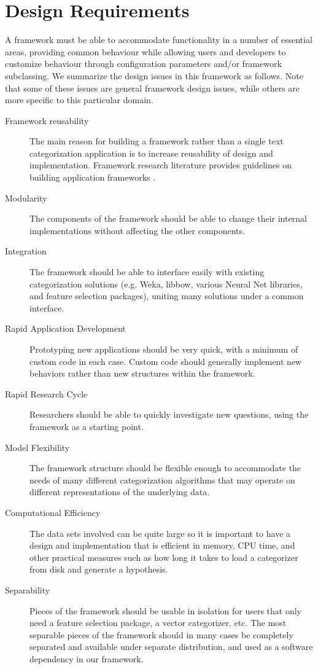 \documentclass[a4paper,twocolumn]{article}
\begin{document}
\section{Design Requirements}

A framework must be able to accommodate functionality in a number of essential areas, providing common behaviour while allowing users and developers to customize behaviour through configuration parameters and/or framework subclassing.  We summarize the design issues in this framework as follows.  Note that some of these issues are general framework design issues, while others are more specific to this particular domain.

\begin{description}
\item[Framework reusability] The main reason for building a framework rather than a single text categorization application is to increase reusability of design and implementation.  Framework research literature provides guidelines on building application frameworks \cite{fayad:99}.
\item[Modularity] The components of the framework should be able to change their internal implementations without affecting the other components.
\item[Integration] The framework should be able to interface easily with existing categorization solutions (e.g. Weka, libbow, various Neural Net libraries, and feature selection packages), uniting many solutions under a common interface.
\item[Rapid Application Development] Prototyping new applications should be very quick, with a minimum of custom code in each case.  Custom code should generally implement new behaviors rather than new structures within the framework.
\item[Rapid Research Cycle] Researchers should be able to quickly investigate new questions, using the framework as a starting point.
\item[Model Flexibility] The framework structure should be flexible enough to accommodate the needs of many different categorization algorithms that may operate on different representations of the underlying data.
\item[Computational Efficiency] The data sets involved can be quite large so it is important to have a design and implementation that is efficient in memory, CPU time, and other practical measures such as how long it takes to load a categorizer from disk and generate a hypothesis.
\item[Separability] Pieces of the framework should be usable in isolation for users that only need a feature selection package, a vector categorizer, etc.  The most separable pieces of the framework should in many cases be completely separated and available under separate distribution, and used as a software dependency in our framework.
\end{description}
\end{document}
